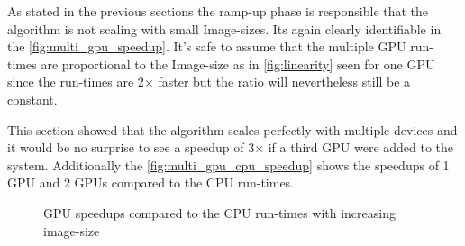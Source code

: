 As stated in the previous sections the ramp-up phase is responsible that the
algorithm is not scaling with small Image-sizes. Its again clearly identifiable
in the \autoref{fig:multi_gpu_speedup}. It's safe to assume that the multiple
\gls{GPU} run-times are proportional to the Image-size as in
\autoref{fig:linearity} seen for one \gls{GPU} since the run-times are 2$\times$
faster but the ratio will nevertheless still be a constant. 

This section showed that the algorithm
scales perfectly with multiple devices and it would be no surprise to see a
speedup of 3$\times$ if a third \gls{GPU} were added to the system. Additionally
the \autoref{fig:multi_gpu_cpu_speedup} shows the speedups of 1 \gls{GPU} and 2
\glspl{GPU} compared to the \gls{CPU} run-times.

\begin{figure}[ht]
  \centering
	

	\tableA
	\tableB	

	\caption{{\protect\Gls{GPU}} speedups compared to the {\protect\gls{CPU}} 
					 run-times with increasing image-size}%
	\label{fig:multi_gpu_cpu_speedup}
\end{figure}

